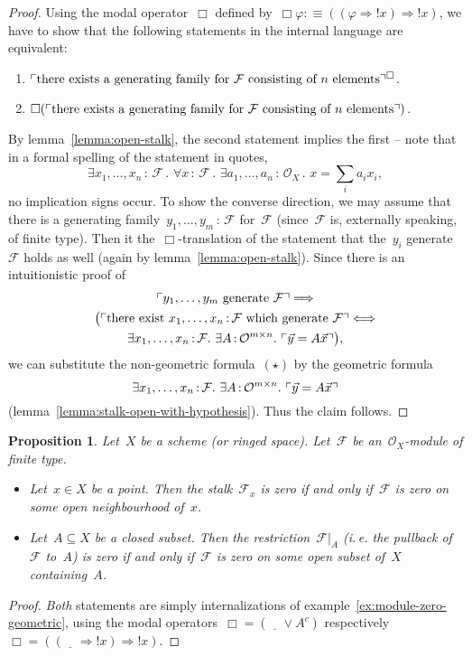 \documentclass[10pt]{amsart}
\makeatletter
\theoremstyle{definition}
\theoremstyle{plain}
\newtheorem{prop}[defn]{Proposition}
\theoremstyle{remark}
\newcommand{\F}{\mathcal{F}}
\renewcommand{\O}{\mathcal{O}}
\newcommand{\placeholder}{\underline{\quad}}
\newcommand{\?}{\,{:}\,}
\renewcommand{\_}{\mathpunct{.}\,}
\newcommand{\speak}[1]{\ulcorner\text{\textnormal{#1}}\urcorner}
\newcommand{\notat}[1]{{!#1}}
\newcommand{\ie}{i.\,e.\@\xspace}
\makeatother
\begin{document}
\begin{proof}Using the modal operator~$\Box$ defined by~$\Box\varphi :\equiv
((\varphi \Rightarrow \notat{x}) \Rightarrow \notat{x})$, we have to show that
the following statements in the internal language are equivalent:
\begin{enumerate}
\item $\speak{there exists a generating family
for~$\F$ consisting of~$n$ elements}^\Box$.
\item $\Box(\speak{there exists a generating family
for~$\F$ consisting of~$n$ elements})$.
\end{enumerate}
By lemma~\ref{lemma:open-stalk}, the second statement implies the first -- note
that in a formal spelling of the statement in quotes,
\begin{equation}
  \tag{$\star$}
  \exists x_1,\ldots,x_n\?\F\_
  \forall x\?\F\_
  \exists a_1,\ldots,a_n\?\O_X\_
  x = \textstyle\sum_i a_i x_i,
\end{equation}
no implication signs occur. To show the converse direction,
we may assume that there is a generating family~$y_1,\ldots,y_m\?\F$ for~$\F$
(since~$\F$ is, externally speaking, of finite type). Then it
the~$\Box$-translation of the statement that the~$y_i$ generate~$\F$ holds as
well (again by lemma~\ref{lemma:open-stalk}). Since there is an intuitionistic
proof of
\begin{multline*}
  \speak{$y_1,\ldots,y_m$ generate~$\F$} \Longrightarrow \\
  \bigl(\speak{there exist $x_1,\ldots,x_n\?\F$ which generate~$\F$}
    \Longleftrightarrow \\
    \exists x_1,\ldots,x_n\?\F\_
    \exists A\?\O^{m \times n}\_ \speak{$\vec y = A \vec x$}\bigr),
\end{multline*}
we can substitute the non-geometric formula~$(\star)$ by the geometric
formula
\[ \exists x_1,\ldots,x_n\?\F\_ \exists A\?\O^{m \times n}\_ \speak{$\vec
y = A \vec x$} \]
(lemma~\ref{lemma:stalk-open-with-hypothesis}). Thus the claim follows.
\end{proof}

\begin{prop}Let~$X$ be a scheme (or ringed space). Let~$\F$ be an~$\O_X$-module
of finite type.
\begin{itemize}
\item Let~$x \in X$ be a point. Then the stalk~$\F_x$ is zero if and
only if~$\F$ is zero on some open neighbourhood of~$x$.
\item Let~$A \subseteq X$ be a closed subset. Then the restriction~$\F|_A$ (\ie
the pullback of~$\F$ to~$A$) is zero if and only if~$\F$ is zero on some open
subset of~$X$ containing~$A$.
\end{itemize}
\end{prop}
\begin{proof}\emph{Both} statements are simply internalizations of
example~\ref{ex:module-zero-geometric}, using the modal operators~$\Box =
(\placeholder \vee A^c)$ respectively~$\Box = ((\placeholder \Rightarrow
\notat{x}) \Rightarrow \notat{x})$.
\end{proof}
\end{document}
